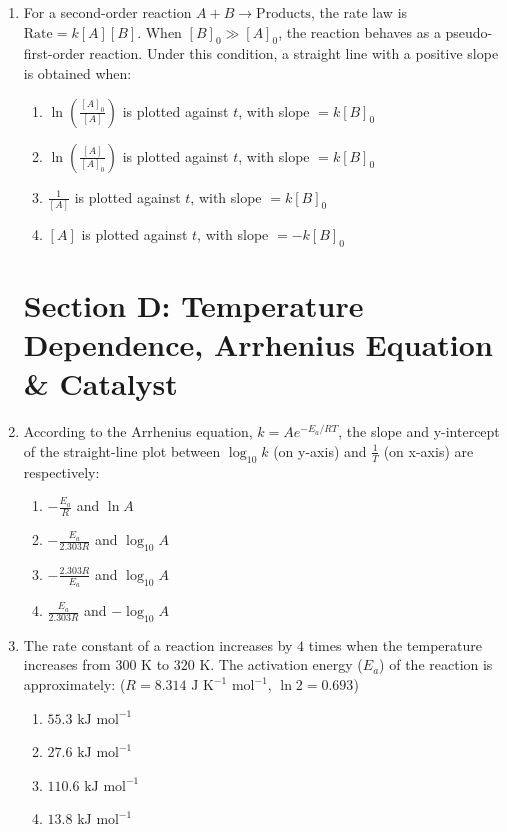 \documentclass[11pt, a4paper]{article}
\begin{document}
\begin{enumerate}
\item For a second-order reaction $A + B \rightarrow \text{Products}$, the rate law is $\text{Rate} = k[A][B]$. When $[B]_0 \gg [A]_0$, the reaction behaves as a pseudo-first-order reaction. Under this condition, a straight line with a positive slope is obtained when:
\begin{enumerate}
    \item $\ln\left(\frac{[A]_0}{[A]}\right)$ is plotted against $t$, with slope $= k[B]_0$
    \item $\ln\left(\frac{[A]}{[A]_0}\right)$ is plotted against $t$, with slope $= k[B]_0$
    \item $\frac{1}{[A]}$ is plotted against $t$, with slope $= k[B]_0$
    \item $[A]$ is plotted against $t$, with slope $= -k[B]_0$
\end{enumerate}

\section*{Section D: Temperature Dependence, Arrhenius Equation \& Catalyst}

\item According to the Arrhenius equation, $k = A e^{-E_a / RT}$, the slope and y-intercept of the straight-line plot between $\log_{10} k$ (on y-axis) and $\frac{1}{T}$ (on x-axis) are respectively:
\begin{enumerate}
    \item $-\frac{E_a}{R}$ and $\ln A$
    \item $-\frac{E_a}{2.303 R}$ and $\log_{10} A$
    \item $-\frac{2.303 R}{E_a}$ and $\log_{10} A$
    \item $\frac{E_a}{2.303 R}$ and $-\log_{10} A$
\end{enumerate}

\item The rate constant of a reaction increases by $4$ times when the temperature increases from $300\text{ K}$ to $320\text{ K}$. The activation energy ($E_a$) of the reaction is approximately: ($R = 8.314\text{ J K}^{-1}\text{ mol}^{-1}$, $\ln 2 = 0.693$)
\begin{enumerate}
    \item $55.3\text{ kJ mol}^{-1}$
    \item $27.6\text{ kJ mol}^{-1}$
    \item $110.6\text{ kJ mol}^{-1}$
    \item $13.8\text{ kJ mol}^{-1}$
\end{enumerate}


\end{enumerate}
\end{document}
